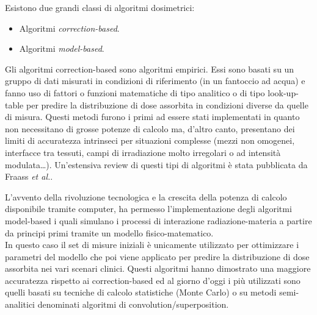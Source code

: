Esistono due grandi classi di algoritmi dosimetrici:
\begin{itemize}
\item Algoritmi \textit{correction-based}.
\item Algoritmi \textit{model-based}.
\end{itemize}
Gli algoritmi correction-based sono algoritmi empirici. Essi sono  basati su un gruppo di dati misurati in condizioni di riferimento (in un fantoccio ad acqua) e fanno uso di fattori o funzioni matematiche di tipo analitico o di tipo look-up-table per predire la distribuzione di dose assorbita in condizioni diverse da quelle di misura. 
Questi metodi furono i primi ad essere stati implementati in quanto non necessitano di grosse potenze di calcolo ma, d'altro canto, presentano dei limiti di accuratezza intrinseci per situazioni complesse (mezzi non omogenei, interfacce tra tessuti, campi di irradiazione molto irregolari o ad intensità modulata\ldots). Un'estensiva review di questi tipi di algoritmi è stata pubblicata da Fraass \textit{et al.}\cite{Fraass1995}.

\vspace{.2cm}
L'avvento della rivoluzione tecnologica e la crescita della potenza di calcolo disponibile tramite computer, ha permesso l'implementazione degli algoritmi model-based i quali simulano i processi di interazione radiazione-materia  a partire da principi primi tramite un modello fisico-matematico.\\
In questo caso il set di misure iniziali è unicamente utilizzato per ottimizzare i parametri del modello che poi viene applicato per predire la distribuzione di dose assorbita nei vari scenari clinici. Questi algoritmi hanno dimostrato una maggiore accuratezza rispetto ai correction-based ed al giorno d'oggi i più utilizzati sono quelli basati su tecniche di calcolo statistiche (Monte Carlo) o su metodi semi-analitici denominati algoritmi di convolution/superposition.

